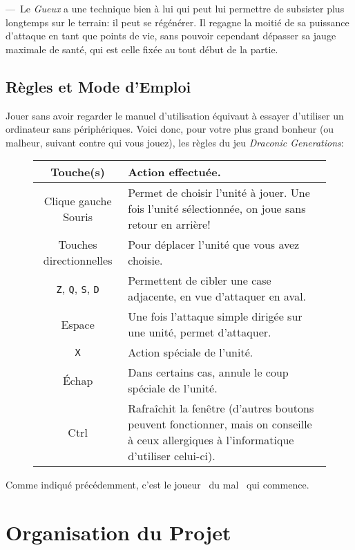 \documentclass[11pt, a4paper, oneside, portrait]{article}
\begin{document}
            ---~Le \emph{Gueux} a une technique bien à lui qui peut lui permettre de subsister plus longtemps sur le terrain: il peut se régénérer.
            Il regagne la moitié de sa puissance d'attaque en tant que points de vie, sans pouvoir cependant dépasser sa jauge maximale de santé, qui est celle fixée au tout début de la partie.

        \subsection*{Règles et Mode d'Emploi}
            Jouer sans avoir regarder le manuel d'utilisation équivaut à essayer d'utiliser un ordinateur sans périphériques.
            Voici donc, pour votre plus grand bonheur (ou malheur, suivant contre qui vous jouez), les règles du jeu \emph{Draconic Generations}:
            \begin{figure}[H]
                \centering
                \begin{tabularx}{0.75\textwidth}{|c|X|}
                    \hline
                    Touche(s) & Action effectuée.\\
                    \hline
                    Clique gauche Souris & Permet de choisir l'unité à jouer. Une fois l'unité sélectionnée, on joue sans retour en arrière!\\
                    \hline
                    Touches directionnelles & Pour déplacer l'unité que vous avez choisie.\\
                    \hline
                    \texttt{Z}, \texttt{Q}, \texttt{S}, \texttt{D} & Permettent de cibler une case adjacente, en vue d'attaquer en aval.\\
                    \hline
                    Espace & Une fois l'attaque simple dirigée sur une unité, permet d'attaquer.\\
                    \hline
                    \texttt{X} & Action spéciale de l'unité.\\
                    \hline
                    Échap & Dans certains cas, annule le coup spéciale de l'unité.\\
                    \hline
                    Ctrl & Rafraîchit la fenêtre (d'autres boutons peuvent fonctionner, mais on conseille à ceux allergiques à l'informatique d'utiliser celui-ci).\\
                    \hline
                \end{tabularx}
            \end{figure}

            Comme indiqué précédemment, c'est le joueur \guillemotleft{}~du mal~\guillemotright{} qui commence.

    \section*{Organisation du Projet}

\end{document}

